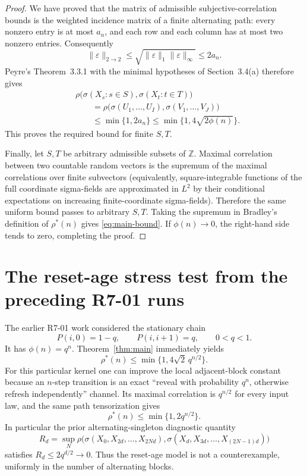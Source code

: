 \documentclass[11pt]{article}
\begin{document}
\begin{proof}
We have proved that the matrix of admissible subjective-correlation bounds is the weighted incidence matrix of a finite alternating path: every nonzero entry is at most $a_n$, and each row and each column has at most two nonzero entries.  Consequently
\[
 \|\varepsilon\|_{2\to2}
 \le\sqrt{\|\varepsilon\|_1\|\varepsilon\|_\infty}
 \le 2a_n.
\]
Peyre's Theorem~3.3.1 with the minimal hypotheses of Section~3.4(a) therefore gives
\begin{align*}
 &\rho\bigl(\sigma(X_s:s\in S),\sigma(X_t:t\in T)\bigr)\\
 &\qquad=\rho\bigl(\sigma(U_1,\dots,U_I),\sigma(V_1,\dots,V_J)\bigr)\\
 &\qquad\le \min\{1,2a_n\}
 \le \min\{1,4\sqrt{2\phi(n)}\}.
\end{align*}
This proves the required bound for finite $S,T$.

Finally, let $S,T$ be arbitrary admissible subsets of $\mathbb Z$.  Maximal correlation between two countable random vectors is the supremum of the maximal correlations over finite subvectors (equivalently, square-integrable functions of the full coordinate sigma-fields are approximated in $L^2$ by their conditional expectations on increasing finite-coordinate sigma-fields).  Therefore the same uniform bound passes to arbitrary $S,T$.  Taking the supremum in Bradley's definition of $\rho^{*}(n)$ gives \eqref{eq:main-bound}.  If $\phi(n)\to0$, the right-hand side tends to zero, completing the proof.
\end{proof}

\section{The reset-age stress test from the preceding R7-01 runs}

The earlier R7-01 work considered the stationary chain
\[
 P(i,0)=1-q,\qquad P(i,i+1)=q,\qquad 0<q<1.
\]
It has $\phi(n)=q^n$.  Theorem~\ref{thm:main} immediately yields
\[
 \rho^{*}(n)\le \min\{1,4\sqrt{2}\,q^{n/2}\}.
\]
For this particular kernel one can improve the local adjacent-block constant because an $n$-step transition is an exact ``reveal with probability $q^n$, otherwise refresh independently'' channel.  Its maximal correlation is $q^{n/2}$ for every input law, and the same path tensorization gives
\[
 \rho^{*}(n)\le \min\{1,2q^{n/2}\}.
\]
In particular the prior alternating-singleton diagnostic quantity
\[
 R_d=\sup_N\rho\bigl(\sigma(X_0,X_{2d},\dots,X_{2Nd}),
                 \sigma(X_d,X_{3d},\dots,X_{(2N-1)d})\bigr)
\]
satisfies $R_d\le2q^{d/2}\to0$.  Thus the reset-age model is not a counterexample, uniformly in the number of alternating blocks.
\end{document}
